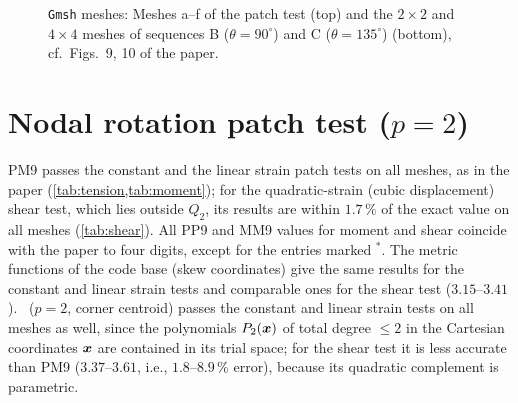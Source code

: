 \documentclass[10pt,a4paper]{article}
\begin{document}
\begin{figure}[t]
  \centering
  
  \caption{\texttt{Gmsh} meshes: Meshes a--f of the patch test (top) and the $2\times2$ and
    $4\times4$ meshes of sequences B ($\theta=90^\circ$) and C ($\theta=135^\circ$) (bottom),
    cf.\ Figs.~9, 10 of the paper.}
  \label{fig:meshes}
\end{figure}

\section{Nodal rotation patch test ($p=2$)}\label{sec:patch}
\begin{table}[h]
  \centering\small
  \caption{Moment loading, $u_y(A)$ (paper: Table~15; exact $1.5$).}
  \label{tab:moment}
  \resizebox{\linewidth}{!}{}

  \vspace{3mm}
  \caption{Shear loading, $u_y(A)$ (paper: Table~16; exact $3.3125$). $^\ast$ after a paper value:
    differs from the present result, see \cref{sec:paper}.}
  \label{tab:shear}
  \resizebox{\linewidth}{!}{}

  \vspace{3mm}
  \caption{Tension, $u_x(A)$ (paper: Table~14; exact $1.0$). $^\ast$ after a paper value: differs
    from the present result, see \cref{sec:paper}. In
    \cref{tab:moment,tab:shear,tab:tension,tab:conv}, ``err.'' marks cases in which the code base
    stops because interior and edge nodes coincide (\cref{sec:code}).}
  \label{tab:tension}
  \resizebox{\linewidth}{!}{}
\end{table}
PM9 passes the constant and the linear strain patch tests on all meshes, as in the paper
(\cref{tab:tension,tab:moment}); for the quadratic-strain (cubic displacement) shear test, which
lies outside $Q_2$, its results are within $1.7\,\%$ of the exact value on all meshes
(\cref{tab:shear}). All PP9 and MM9 values for moment and shear coincide with the paper to four
digits, except for the entries marked $^\ast$. The metric functions of the code base (skew coordinates) give the same results for the
constant and linear strain tests and comparable ones for the shear test ($3.15$--$3.41$). \PH\
($p=2$, corner centroid) passes the constant and linear strain tests on all meshes as well, since
the polynomials $P_2(\bm{x})$ of total degree $\le2$ in the Cartesian coordinates $\bm{x}$ are contained
in its trial space; for the shear test it is less accurate than PM9
($3.37$--$3.61$, i.e., $1.8$--$8.9\,\%$ error), because its quadratic complement is parametric.
\end{document}
